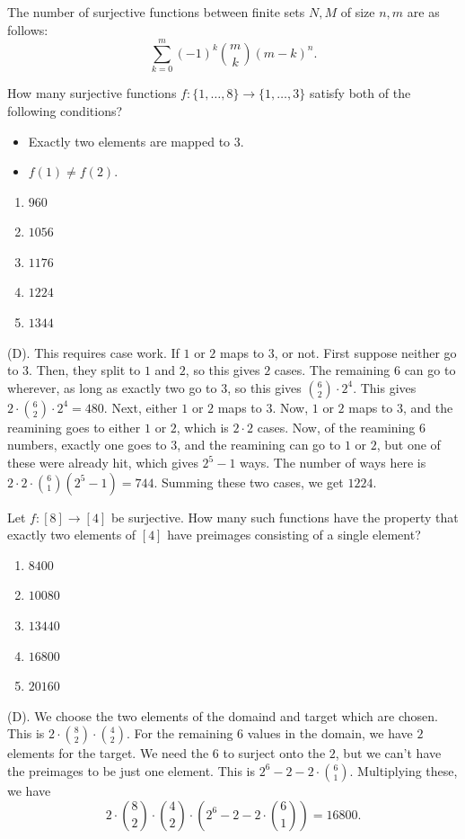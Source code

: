 \begin{remark}
The number of surjective functions between finite sets $N, M$ of 
size $n,m$ are as follows:
\[
\sum_{k = 0}^m (-1)^k {{m}\choose{k}} (m - k)^n.
\]
\end{remark}
\begin{exercise}
How many surjective functions $f:\{1,\dots,8\}\to\{1,\dots,3\}$ satisfy both of the following conditions?
\begin{itemize}
    \item Exactly two elements are mapped to $3$.
    \item $f(1)\neq f(2)$.
\end{itemize}
\begin{enumerate}[label=(\Alph*)]
    \item $960$
    \item $1056$
    \item $1176$
    \item $1224$
    \item $1344$
\end{enumerate}
\end{exercise}
\begin{solution}
(D). This requires case work. If $1$ or $2$ maps to $3$, or not. 
First suppose neither go to $3$. Then, they split to $1$ and $2$, so this 
gives $2$ cases. The remaining 6 can go to wherever, as long as exactly two go to $3$, so 
this gives ${6\choose2}\cdot 2^4$. This gives $2 \cdot {6\choose2}\cdot 2^4 = 480$. Next, 
either $1$ or $2$ maps to $3$. Now, $1$ or $2$ maps to $3$, and the reamining goes to 
either $1$ or $2$, which is $2 \cdot 2$ cases. Now, of the reamining $6$ numbers, exactly one 
goes to $3$, and the reamining can go to $1$ or $2$, but one of these were already hit, which 
gives $2^5 - 1$ ways. The number of ways here is $2 \cdot 2 \cdot {6\choose1} (2^5 - 1) = 744$.
Summing these two cases, we get $1224$. 
\end{solution}

\begin{exercise}
Let $f:[8]\to[4]$ be surjective. How many such functions have 
the property that exactly two elements of $[4]$ have preimages 
consisting of a single element?
\begin{enumerate}[label=(\Alph*)]
    \item $8400$
    \item $10080$
    \item $13440$
    \item $16800$
    \item $20160$
\end{enumerate}
\end{exercise}
\begin{solution}
(D). We choose the two elements of the domaind and target 
which are chosen. This is $2 \cdot {8 \choose 2} \cdot {4 \choose 2}$.
For the remaining $6$ values in the domain, we have $2$ elements for the target. 
We need the $6$ to surject onto the $2$, but we can't have the preimages to be just one element.
This is $2^6 - 2 - 2 \cdot {6\choose1}$. Multiplying these, we have 
\[
2 \cdot {8 \choose 2} \cdot {4 \choose 2} \cdot \left(2^6 - 2 - 2 \cdot {6\choose1}\right)
= 16800.
\]
\end{solution}

